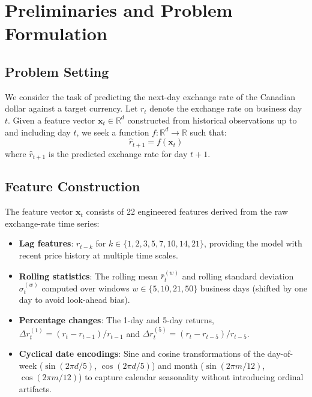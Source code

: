\documentclass{article}
\begin{document}
\section{Preliminaries and Problem Formulation}

\subsection{Problem Setting}

We consider the task of predicting the next-day exchange rate of the Canadian dollar against a target currency. Let $r_t$ denote the exchange rate on business day $t$. Given a feature vector $\mathbf{x}_t \in \mathbb{R}^d$ constructed from historical observations up to and including day $t$, we seek a function $f: \mathbb{R}^d \rightarrow \mathbb{R}$ such that:
\begin{equation}
  \hat{r}_{t+1} = f(\mathbf{x}_t)
\end{equation}
where $\hat{r}_{t+1}$ is the predicted exchange rate for day $t+1$.

\subsection{Feature Construction}

The feature vector $\mathbf{x}_t$ consists of 22 engineered features derived from the raw exchange-rate time series:

\begin{itemize}
  \item \textbf{Lag features}: $r_{t-k}$ for $k \in \{1, 2, 3, 5, 7, 10, 14, 21\}$, providing the model with recent price history at multiple time scales.
  \item \textbf{Rolling statistics}: The rolling mean $\bar{r}_{t}^{(w)}$ and rolling standard deviation $\sigma_{t}^{(w)}$ computed over windows $w \in \{5, 10, 21, 50\}$ business days (shifted by one day to avoid look-ahead bias).
  \item \textbf{Percentage changes}: The 1-day and 5-day returns, $\Delta r_t^{(1)} = (r_t - r_{t-1})/r_{t-1}$ and $\Delta r_t^{(5)} = (r_t - r_{t-5})/r_{t-5}$.
  \item \textbf{Cyclical date encodings}: Sine and cosine transformations of the day-of-week ($\sin(2\pi d/5)$, $\cos(2\pi d/5)$) and month ($\sin(2\pi m/12)$, $\cos(2\pi m/12)$) to capture calendar seasonality without introducing ordinal artifacts.
\end{itemize}
\end{document}
